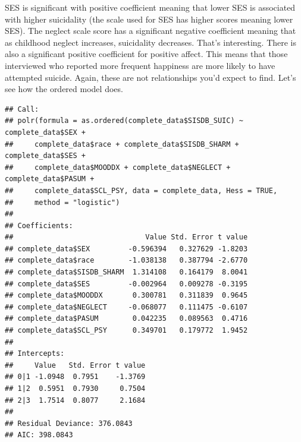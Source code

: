 \documentclass[
]{article}
\newenvironment{Shaded}{\begin{snugshade}}{\end{snugshade}}
\newcommand{\AttributeTok}[1]{\textcolor[rgb]{0.77,0.63,0.00}{#1}}
\newcommand{\ConstantTok}[1]{\textcolor[rgb]{0.00,0.00,0.00}{#1}}
\newcommand{\FunctionTok}[1]{\textcolor[rgb]{0.00,0.00,0.00}{#1}}
\newcommand{\NormalTok}[1]{#1}
\newcommand{\OtherTok}[1]{\textcolor[rgb]{0.56,0.35,0.01}{#1}}
\newcommand{\SpecialCharTok}[1]{\textcolor[rgb]{0.00,0.00,0.00}{#1}}
\newcommand{\StringTok}[1]{\textcolor[rgb]{0.31,0.60,0.02}{#1}}
\begin{document}
SES is significant with positive coefficient meaning that lower SES is
associated with higher suicidality (the scale used for SES has higher
scores meaning lower SES). The neglect scale score has a significant
negative coefficient meaning that as childhood neglect increases,
suicidality decreases. That's interesting. There is also a significant
positive coefficient for positive affect. This means that those
interviewed who reported more frequent happiness are more likely to have
attempted suicide. Again, these are not relationships you'd expect to
find. Let's see how the ordered model does.

\begin{Shaded}
\end{Shaded}

\begin{verbatim}
## Call:
## polr(formula = as.ordered(complete_data$SISDB_SUIC) ~ complete_data$SEX + 
##     complete_data$race + complete_data$SISDB_SHARM + complete_data$SES + 
##     complete_data$MOODDX + complete_data$NEGLECT + complete_data$PASUM + 
##     complete_data$SCL_PSY, data = complete_data, Hess = TRUE, 
##     method = "logistic")
## 
## Coefficients:
##                               Value Std. Error t value
## complete_data$SEX         -0.596394   0.327629 -1.8203
## complete_data$race        -1.038138   0.387794 -2.6770
## complete_data$SISDB_SHARM  1.314108   0.164179  8.0041
## complete_data$SES         -0.002964   0.009278 -0.3195
## complete_data$MOODDX       0.300781   0.311839  0.9645
## complete_data$NEGLECT     -0.068077   0.111475 -0.6107
## complete_data$PASUM        0.042235   0.089563  0.4716
## complete_data$SCL_PSY      0.349701   0.179772  1.9452
## 
## Intercepts:
##     Value   Std. Error t value
## 0|1 -1.0948  0.7951    -1.3769
## 1|2  0.5951  0.7930     0.7504
## 2|3  1.7514  0.8077     2.1684
## 
## Residual Deviance: 376.0843 
## AIC: 398.0843
\end{verbatim}
\end{document}
